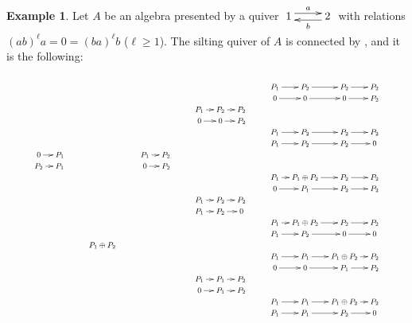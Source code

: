 \documentclass[a4paper,reqno]{amsart}
\theoremstyle{definition}
\newtheorem{example}[theorem]{Example}
\begin{document}
\begin{example}
Let $A$ be an algebra presented by a quiver $\xymatrix{1\ar^a@<.3em>[r]&\ar^b@<.3em>[l]2}$
with relations $(ab)^{\ell}a=0=(ba)^{\ell}b$ ($\ell\ge1$).
The silting quiver of $A$ is connected by \cite{A2}, and it is the following:
\[
{\small{
\xymatrix@R=0.1pt @C=0.3cm{
&& & && && & && & & && & & & &&\\
&& & && && & && & & && P_1 \ar[r] & P_2 \ar[r] & P_2 \ar[r] & P_2 &&\\
&& & && && & && & & && 0 \ar[r] & 0 \ar[r] & 0 \ar[r] & P_2 &&\\
&& & && && & && P_1 \ar[r] & P_2 \ar[r] & P_2 && & & & &&\\
&& & && && & && 0 \ar[r] & 0 \ar[r] & P_2 && & & & &&\\   
&& & && && & && & & && P_1 \ar[r] & P_2 \ar[r] & P_2 \ar[r] & P_2 &&\\
&& & && && & && & & && P_1 \ar[r] & P_2 \ar[r] & P_2 \ar[r] & 0 &&\\
&& 0 \ar[r] & P_1 && && P_1 \ar[r] & P_2 && & & && & & & &&\\
&& P_2 \ar[r] & P_1 && && 0 \ar[r] & P_2 && & & && & & & &&\\
&& & && && & && & & && P_1 \ar[r] & P_1\oplus P_2 \ar[r] & P_2 \ar[r] & P_2 &&\\
&& & && && & && & & && 0 \ar[r] & P_1 \ar[r] & P_2 \ar[r] & P_2 &&\\
&& & && && & && P_1 \ar[r] & P_2 \ar[r] & P_2 && & & & &&\\
&& & && && & && P_1 \ar[r] & P_2 \ar[r] & 0 && & & & &&\\
&& & && && & && & & && P_1 \ar[r] & P_1\oplus P_2 \ar[r] & P_2 \ar[r] & P_2 &&\\
&& & && && & && & & && P_1 \ar[r] & P_2 \ar[r] & 0 \ar[r] & 0 &&\\
&& & && P_1\oplus P_2 && & && & & && & & & &&\\
&& & && && & && & & && P_1 \ar[r] & P_1 \ar[r] & P_1\oplus P_2 \ar[r] & P_2 &&\\
&& & && && & && & & && 0 \ar[r] & 0 \ar[r] & P_1 \ar[r] & P_2 &&\\
&& & && && & && P_1 \ar[r] & P_1 \ar[r] & P_2 && & & & &&\\
&& & && && & && 0 \ar[r] & P_1 \ar[r] & P_2 && & & & &&\\
&& & && && & && & & && P_1 \ar[r] & P_1 \ar[r] & P_1\oplus P_2 \ar[r] & P_2 &&\\
&& & && && & && & & && P_1 \ar[r] & P_1 \ar[r] & P_2 \ar[r] & 0 &&\\
}}}\]
\end{example}
\end{document}
